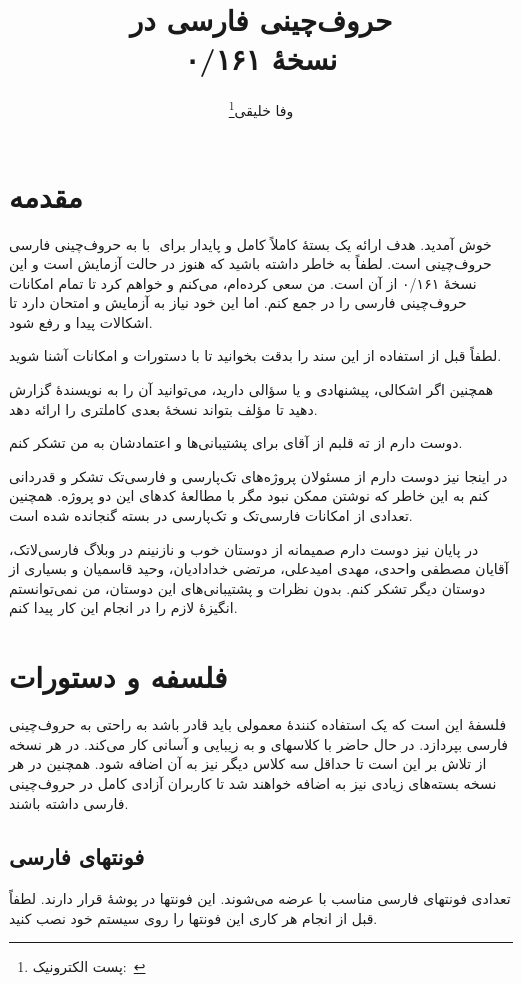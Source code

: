 \documentclass{bookest}
\title{حروف‌چینی فارسی در \eng{\XePersian}\\[0.2cm]نسخهٔ ۰/۱۶۱}
\author{وفا خلیقی\thanks{پست الکترونیک:~\eng{vafa.khalighi@students.mq.edu.au}}}
\begin{document}
\maths
\begin{farsi}
\maketitle
\tableofcontents
\chapter{مقدمه}
به حروف‌چینی فارسی ‪ ‬با ‪\eng{\XePersian} ‬خوش آمدید. هدف \eng{\XePersian} ارائه یک بستهٔ کاملاً کامل و پایدار برای حروف‌چینی است. لطفاً به خاطر داشته باشید که \eng{\XePersian} هنوز در حالت آزمایش است و این نسخهٔ ۰/۱۶۱ از آن است. من سعی کرده‌ام، می‌کنم و خواهم کرد تا تمام امکانات حروف‌چینی فارسی را در \eng{\XePersian} جمع کنم. اما این خود نیاز به آزمایش و امتحان دارد تا اشکالات پیدا و رفع شود.

لطفاً قبل از استفاده از \eng{\XePersian} این سند را بدقت بخوانید تا با دستورات و امکانات \eng{\XePersian} آشنا شوید.

همچنین اگر اشکالی، پیشنهادی و یا سؤالی دارید، می‌توانید آن را به نویسندهٔ \eng{\XePersian} گزارش دهید تا مؤلف \eng{\XePersian} بتواند نسخهٔ بعدی کاملتری را ارائه دهد.

دوست دارم از ته قلبم از آقای  برای پشتیبانی‌ها و اعتمادشان به من تشکر کنم.

در اینجا نیز دوست دارم از مسئولان پروژه‌های تک‌پارسی و فارسی‌تک تشکر و قدردانی کنم به این خاطر که نوشتن \eng{\XePersian} ممکن نبود مگر با مطالعهٔ کدهای این دو پروژه. همچنین تعدادی از امکانات فارسی‌تک و  تک‌پارسی در بسته گنجانده شده است.

در پایان نیز دوست دارم صمیمانه از دوستان خوب و نازنینم در وبلاگ فارسی‌لاتک، آقایان مصطفی واحدی، مهدی امیدعلی، مرتضی خدادادیان، وحید قاسمیان و بسیاری از دوستان دیگر تشکر کنم. بدون نظرات و پشتیبانی‌های این دوستان، من نمی‌توانستم انگیزهٔ لازم را در انجام این کار پیدا کنم.
\chapter{فلسفه و دستورات}
فلسفهٔ \eng{\XePersian} این است که یک استفاده کنندهٔ معمولی باید قادر باشد به راحتی به حروف‌چینی فارسی بپردازد. در حال حاضر \eng{\XePersian} با کلاسهای  و  به زیبایی و آسانی کار می‌کند. در هر نسخه از \eng{\XePersian} تلاش بر این است تا حداقل سه کلاس دیگر نیز به آن اضافه شود. همچنین در هر نسخه بسته‌های زیادی نیز به \eng{\XePersian} اضافه خواهند شد تا کاربران آزادی کامل در حروف‌چینی فارسی داشته باشند.
\section{فونتهای فارسی}
تعدادی فونتهای فارسی مناسب با \eng{\XePersian} عرضه می‌شوند. این فونتها در پوشهٔ  قرار دارند. لطفاً قبل از انجام هر کاری این فونتها را روی سیستم خود نصب کنید.

\end{farsi}
\end{document}
